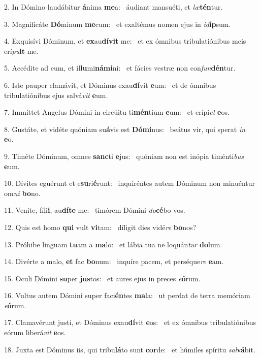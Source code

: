 2. In Dómino laudábitur \textbf{á}nima \textbf{me}a: \ast\  áudiant mansuéti, et \textit{læ}\textbf{tén}tur.\

3. Magnificáte \textbf{Dó}minum \textbf{me}cum: \ast\  et exaltémus nomen ejus in \textit{id}\textbf{íp}sum.\

4. Exquisívi Dóminum, et \textbf{ex}au\textbf{dí}\textbf{vit} me: \ast\  et ex ómnibus tribulatiónibus meis erí\textit{pu}\textbf{it} me.\

5. Accédite ad eum, et il\textbf{lu}mi\textbf{ná}\textbf{mi}ni: \ast\  et fácies vestræ non con\textit{fun}\textbf{dén}tur.\

6. Iste pauper clamávit, et Dóminus exau\textbf{dí}vit \textbf{e}um: \ast\  et de ómnibus tribulatiónibus ejus salvá\textit{vit} \textbf{e}um.\

7. Immíttet Angelus Dómini in circúitu ti\textbf{mén}tium \textbf{e}um: \ast\  et erípi\textit{et} \textbf{e}os.\

8. Gustáte, et vidéte quóniam su\textbf{á}vis est \textbf{Dó}\textbf{mi}nus: \ast\  beátus vir, qui sperat \textit{in} \textbf{e}o.\

9. Timéte Dóminum, omnes \textbf{sanc}ti \textbf{e}jus: \ast\  quóniam non est inópia timénti\textit{bus} \textbf{e}um.\

10. Dívites eguérunt et e\textbf{su}ri\textbf{é}runt: \ast\  inquiréntes autem Dóminum non minuéntur om\textit{ni} \textbf{bo}no.\

11. Veníte, fíli\textbf{i}, au\textbf{dí}\textbf{te} me: \ast\  timórem Dómini \textit{do}\textbf{cé}bo vos.\

12. Quis est homo \textbf{qui} vult \textbf{vi}tam: \ast\  díligit dies vidé\textit{re} \textbf{bo}nos?\

13. Próhibe linguam \textbf{tu}am a \textbf{ma}lo: \ast\  et lábia tua ne loquán\textit{tur} \textbf{do}lum.\

14. Divérte a malo, \textbf{et} fac \textbf{bo}num: \ast\  inquíre pacem, et perséque\textit{re} \textbf{e}am.\

15. Oculi Dómini \textbf{su}per \textbf{jus}tos: \ast\  et aures ejus in preces \textit{e}\textbf{ó}rum.\

16. Vultus autem Dómini super faci\textbf{én}tes \textbf{ma}la: \ast\  ut perdat de terra memóriam \textit{e}\textbf{ó}rum.\

17. Clamavérunt justi, et Dóminus exau\textbf{dí}vit \textbf{e}os: \ast\  et ex ómnibus tribulatiónibus eórum liberá\textit{vit} \textbf{e}os.\

18. Juxta est Dóminus iis, qui tribu\textbf{lá}to sunt \textbf{cor}de: \ast\  et húmiles spíritu \textit{sal}\textbf{vá}bit.\

